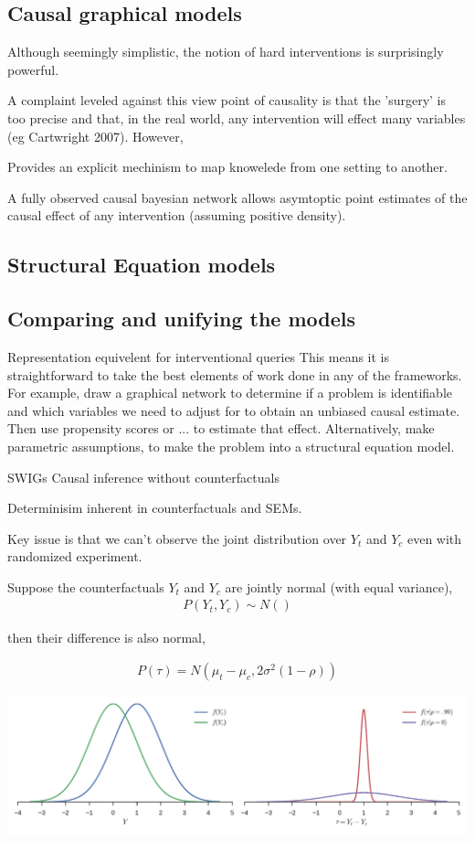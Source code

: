 \documentclass[11pt,a4paper,oneside]{book}
\newcommand{\eq}[1]{\begin{align*}#1\end{align*}}
\begin{document}
\subsection*{Causal graphical models}
Although seemingly simplistic, the notion of hard interventions is surprisingly powerful. 

A complaint leveled against this view point of causality is that the 'surgery' is too precise and that, in the real world, any intervention will effect many variables (eg Cartwright 2007). However, 

Provides an explicit mechinism to map knowelede from one setting to another. 

A fully observed causal bayesian network allows asymtoptic point estimates of the causal effect of any intervention (assuming positive density). 


\subsection*{Structural Equation models}


\subsection*{Comparing and unifying the models}
Representation equivelent for interventional queries
This means it is straightforward to take the best elements of work done in any of the frameworks. For example, draw a graphical network to determine if a problem is identifiable and which variables we need to adjust for to obtain an unbiased causal estimate. Then use propensity scores or ... to estimate that effect. Alternatively, make parametric assumptions, to make the problem into a structural equation model. 

SWIGs \cite{Richardson2013}
\cite{Dawid2000} Causal inference without counterfactuals

Determinisim inherent in counterfactuals and SEMs.

Key issue is that we can't observe the joint distribution over $Y_t$ and $Y_c$ even with randomized experiment. 

Suppose the counterfactuals $Y_t$ and $Y_c$ are jointly normal (with equal variance),
\eq{
P(Y_t,Y_c) \sim N()
}

then their difference is also normal,

\eq{
P(\tau) = N(\mu_t - \mu_c,2\sigma^{2}(1-\rho))
}

\includegraphics[scale=.6]{figures/counterfactual_nonidentify.pdf}
\end{document}

